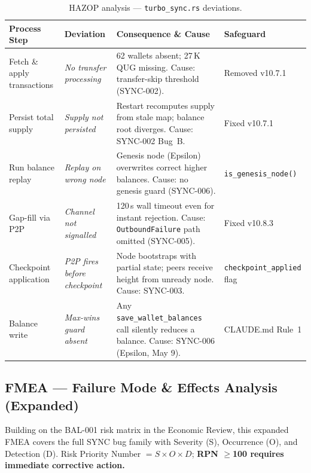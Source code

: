 \documentclass[12pt,a4paper]{article}
\begin{document}
\begin{table}[H]
\centering
\small
\renewcommand{\arraystretch}{1.25}
\begin{tabularx}{\linewidth}{llXl}
\toprule
\textbf{Process Step} & \textbf{Deviation} & \textbf{Consequence \& Cause} & \textbf{Safeguard} \\
\midrule
Fetch \& apply transactions &
  \emph{No transfer processing} &
  62 wallets absent; 27\,K\,QUG missing.
  Cause: transfer-skip threshold (SYNC-002). &
  Removed v10.7.1 \\
\rowcolor{rowgray}
Persist total supply &
  \emph{Supply not persisted} &
  Restart recomputes supply from stale map; balance root diverges.
  Cause: SYNC-002 Bug~B. &
  Fixed v10.7.1 \\
Run balance replay &
  \emph{Replay on wrong node} &
  Genesis node (Epsilon) overwrites correct higher balances.
  Cause: no genesis guard (SYNC-006). &
  \texttt{is\_genesis\_node()} \\
\rowcolor{rowgray}
Gap-fill via P2P &
  \emph{Channel not signalled} &
  120\,s wall timeout even for instant rejection.
  Cause: \texttt{OutboundFailure} path omitted (SYNC-005). &
  Fixed v10.8.3 \\
Checkpoint application &
  \emph{P2P fires before checkpoint} &
  Node bootstraps with partial state; peers receive height from unready node.
  Cause: SYNC-003. &
  \texttt{checkpoint\_applied} flag \\
\rowcolor{rowgray}
Balance write &
  \emph{Max-wins guard absent} &
  Any \texttt{save\_wallet\_balances} call silently reduces a balance.
  Cause: SYNC-006 (Epsilon, May 9). &
  CLAUDE.md Rule~1 \\
\bottomrule
\end{tabularx}
\caption{HAZOP analysis --- \texttt{turbo\_sync.rs} deviations.}
\end{table}

\subsection{FMEA --- Failure Mode \& Effects Analysis (Expanded)}

Building on the BAL-001 risk matrix in the Economic Review, this expanded FMEA
covers the full SYNC bug family with Severity (S), Occurrence (O), and Detection (D).
Risk Priority Number $= S \times O \times D$;
\textbf{RPN $\geq$100 requires immediate corrective action.}
\end{document}
